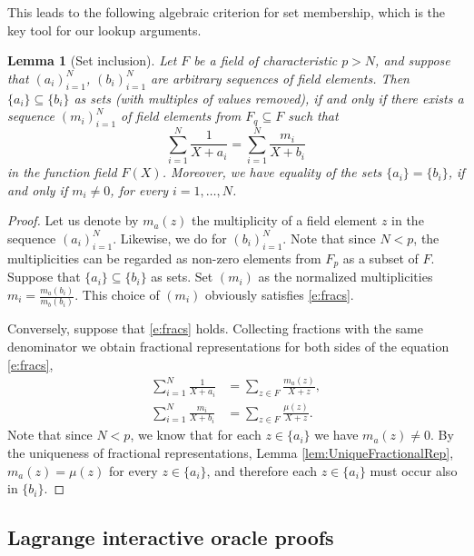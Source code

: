 \documentclass[11pt]{article}
\newtheorem{lem}[]{Lemma}
\theoremstyle{definition}
\theoremstyle{remark}
\begin{document}
This leads to the following algebraic criterion for set membership, which is the key tool for our lookup arguments.
\begin{lem}[Set inclusion]
\label{lem:batchsetmembership}
Let $F$ be a field of characteristic $p>N$, and suppose that $(a_i)_{i=1}^N$, $(b_i)_{i=1}^N$ are arbitrary sequences of field elements.
Then $\{a_i \}\subseteq \{b_i\}$ as sets (with multiples of values removed), if and only if there exists a sequence $(m_i)_{i=1}^N$ of field elements from $F_q\subseteq F$ such that
\begin{equation}
\label{e:fracs}
\sum_{i=1}^N \frac{1}{X + a_i} = \sum_{i=1}^N \frac{m_i}{X + b_i}  
\end{equation}
in the function field $F(X)$.
Moreover, we have equality of the sets $\{a_i\} = \{b_i\}$, if and only if $m_i\neq 0$, for every $i=1,\ldots, N$.
\end{lem}

\begin{proof}%
Let us denote by $m_a(z)$ the multiplicity of a field element $z$ in the sequence $(a_i)_{i=1}^N$.
Likewise, we do for $(b_i)_{i=1}^N$.
Note that since $N < p$, the multiplicities can be regarded as non-zero elements from $F_p$ as a subset of $F$.
Suppose that $\{a_i\}\subseteq \{b_i\}$ as sets. 
Set $(m_i)$ as the normalized multiplicities
$
m_i = \frac{m_a(b_i)}{m_b(b_i)}.
$
This choice of $(m_i)$ obviously satisfies \eqref{e:fracs}.

Conversely, suppose that \eqref{e:fracs} holds.
Collecting fractions with the same denominator we obtain fractional representations for both sides of the equation \eqref{e:fracs},  
\begin{align*}
\sum_{i=1}^N \frac{1}{X + a_i} &= \sum_{z\in F} \frac{m_a(z)}{X + z},
\\
\sum_{i=1}^N \frac{m_i}{X + b_i} & = \sum_{z\in F} \frac{\mu (z)}{X + z}.
\end{align*}
Note that since $N < p$, we know that for each $z\in \{a_i\}$ we have $m_a(z)\neq 0$. 
By the uniqueness of fractional representations,  Lemma \ref{lem:UniqueFractionalRep}, $m_a(z) = \mu(z)$ for every $z\in \{a_i\}$, and therefore each $z\in \{a_i\}$ must occur also in $\{b_i\}$. 
\end{proof}



\subsection{Lagrange interactive oracle proofs}
\end{document}
